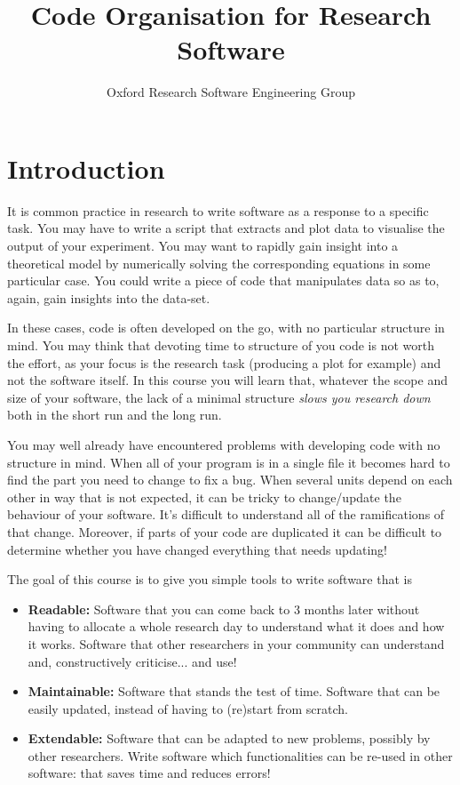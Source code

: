 \documentclass[a4paper]{article}
\begin{document}
\title{Code Organisation for Research Software}
\author{Oxford Research Software Engineering Group}
\maketitle

\section{Introduction}
It is common practice in research to write software as a response to a specific task.
You may have to write a script that extracts and plot data to visualise the output of your experiment.
You may want to rapidly gain insight into a theoretical model by numerically solving the corresponding equations in some particular case.
You could write a piece of code that manipulates data so as to, again, gain insights into the data-set.

In these cases, code is often developed on the go, with no particular structure in mind.
You may think that devoting time to structure of you code is not worth the effort, as your focus is the research task (producing a plot for example) and not the software itself.
In this course you will learn that, whatever the scope and size of your software, the lack of a minimal structure \textit{slows you research down} both in the short run and the long run.

You may well already have encountered problems with developing code with no structure in mind.
When all of your program is in a single file it becomes hard to find the part you need to change to fix a bug.
When several units depend on each other in way that is not expected, it can be tricky to change/update the behaviour of your software.
It's difficult to understand all of the ramifications of that change.
Moreover, if parts of your code are duplicated it can be difficult to determine whether you have changed everything that needs updating!

The goal of this course is to give you simple tools to write software that is
\begin{itemize}
\item \textbf{Readable:} Software that you can come back to 3 months later without having to allocate a whole research day to understand what it does and how it works.
  Software that other researchers in your community can understand and, constructively criticise... and use!
\item \textbf{Maintainable:} Software that stands the test of time. Software that can be easily updated, instead of having to (re)start from scratch.
\item \textbf{Extendable:} Software that can be adapted to new problems, possibly by other researchers. Write software which functionalities can be re-used in other software: that saves time and reduces errors!
\end{itemize}
\end{document}
